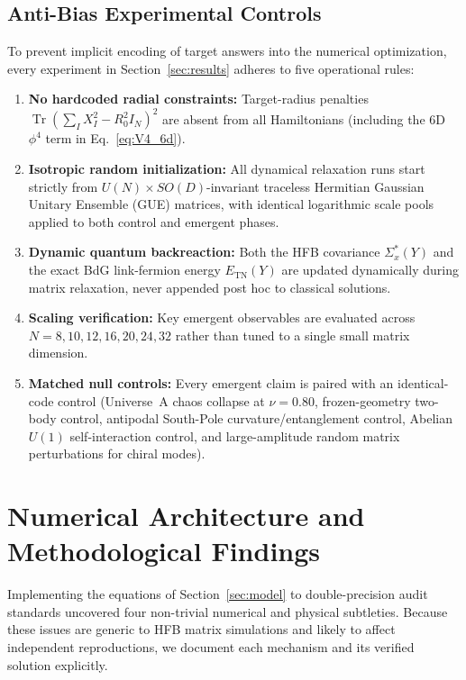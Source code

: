\documentclass[11pt,a4paper]{article}
\DeclareMathOperator{\Tr}{Tr}
\begin{document}
\subsection{Anti-Bias Experimental Controls}
To prevent implicit encoding of target answers into the numerical optimization, every experiment in Section~\ref{sec:results} adheres to five operational rules:
\begin{enumerate}
  \item \textbf{No hardcoded radial constraints:} Target-radius penalties $\Tr(\sum_I X_I^2 - R_0^2 I_N)^2$ are absent from all Hamiltonians (including the 6D $\phi^4$ term in Eq.~\eqref{eq:V4_6d}).
  \item \textbf{Isotropic random initialization:} All dynamical relaxation runs start strictly from $U(N)\times SO(D)$-invariant traceless Hermitian Gaussian Unitary Ensemble (GUE) matrices, with identical logarithmic scale pools applied to both control and emergent phases.
  \item \textbf{Dynamic quantum backreaction:} Both the HFB covariance $\Sigma_x^*(Y)$ and the exact BdG link-fermion energy $E_{\mathrm{TN}}(Y)$ are updated dynamically during matrix relaxation, never appended post hoc to classical solutions.
  \item \textbf{Scaling verification:} Key emergent observables are evaluated across $N = 8, 10, 12, 16, 20, 24, 32$ rather than tuned to a single small matrix dimension.
  \item \textbf{Matched null controls:} Every emergent claim is paired with an identical-code control (Universe~A chaos collapse at $\nu=0.80$, frozen-geometry two-body control, antipodal South-Pole curvature/entanglement control, Abelian $U(1)$ self-interaction control, and large-amplitude random matrix perturbations for chiral modes).
\end{enumerate}

\section{Numerical Architecture and Methodological Findings}
\label{sec:methods}

Implementing the equations of Section~\ref{sec:model} to double-precision audit standards uncovered four non-trivial numerical and physical subtleties. Because these issues are generic to HFB matrix simulations and likely to affect independent reproductions, we document each mechanism and its verified solution explicitly.
\end{document}
